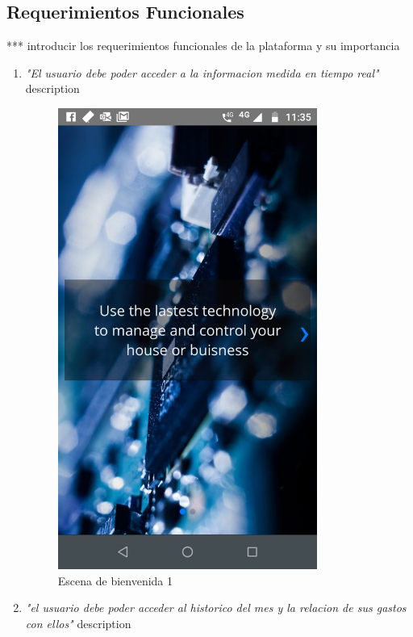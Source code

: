 \subsection{Requerimientos Funcionales}

*** introducir los requerimientos funcionales de la plataforma y su importancia


\begin{enumerate}
	\item \textsl{"El usuario debe poder acceder a la informacion medida en tiempo real"} description
	
	\begin{figure}[htbp]
		\centerline{\includegraphics[width=8.5cm]{./figuras/mobile_intro1.jpeg}}
		\caption{Escena de bienvenida 1}
		\label{fig_12}
	\end{figure}
	
	\item \textsl{"el usuario debe poder acceder al historico del mes y la relacion de sus gastos con ellos"} description
	

\end{enumerate}
